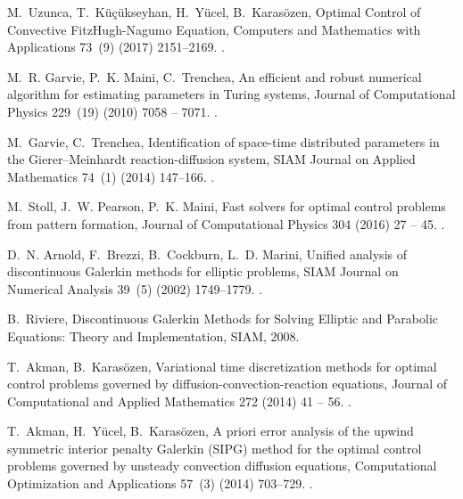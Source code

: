 \documentclass[preprint,12pt]{elsarticle}
\begin{document}
\begin{thebibliography}{10}
M.~{Uzunca}, T.~{K{\"u}{\c c}{\"u}kseyhan}, H.~{Y{\"u}cel}, B.~{Karas{\"o}zen},
  {Optimal Control of Convective {FitzHugh-Nagumo} Equation}, Computers and
  Mathematics with Applications 73~(9) (2017) 2151--2169.
\newblock \href {https://doi.org/10.1016/j.camwa.2017.02.028}
  {}.

M.~R. Garvie, P.~K. Maini, C.~Trenchea, An efficient and robust numerical
  algorithm for estimating parameters in {Turing} systems, Journal of
  Computational Physics 229~(19) (2010) 7058 -- 7071.
\newblock \href {https://doi.org/10.1016/j.jcp.2010.05.040}
  {}.

M.~Garvie, C.~Trenchea, Identification of space-time distributed parameters in
  the {Gierer--Meinhardt} reaction-diffusion system, SIAM Journal on Applied
  Mathematics 74~(1) (2014) 147--166.
\newblock \href {https://doi.org/10.1137/120885784}
  {}.

M.~Stoll, J.~W. Pearson, P.~K. Maini, Fast solvers for optimal control problems
  from pattern formation, Journal of Computational Physics 304 (2016) 27 -- 45.
\newblock \href {https://doi.org/10.1016/j.jcp.2015.10.006}
  {}.

D.~N. Arnold, F.~Brezzi, B.~Cockburn, L.~D. Marini, Unified analysis of
  discontinuous {Galerkin} methods for elliptic problems, SIAM Journal on
  Numerical Analysis 39~(5) (2002) 1749--1779.
\newblock \href {https://doi.org/10.1137/S0036142901384162}
  {}.

B.~Riviere, {Discontinuous Galerkin Methods for Solving Elliptic and Parabolic
  Equations: Theory and Implementation}, SIAM, 2008.

T.~Akman, B.~Karas{\"o}zen, Variational time discretization methods for optimal
  control problems governed by diffusion-convection-reaction equations, Journal
  of Computational and Applied Mathematics 272 (2014) 41 -- 56.
\newblock \href {https://doi.org/10.1016/j.cam.2014.05.002}
  {}.

T.~Akman, H.~Y{\"u}cel, B.~Karas{\"o}zen, A priori error analysis of the upwind
  symmetric interior penalty {Galerkin} {(SIPG)} method for the optimal control
  problems governed by unsteady convection diffusion equations, Computational
  Optimization and Applications 57~(3) (2014) 703--729.
\newblock \href {https://doi.org/10.1007/s10589-013-9601-4}
  {}.


\end{thebibliography}
\end{document}
